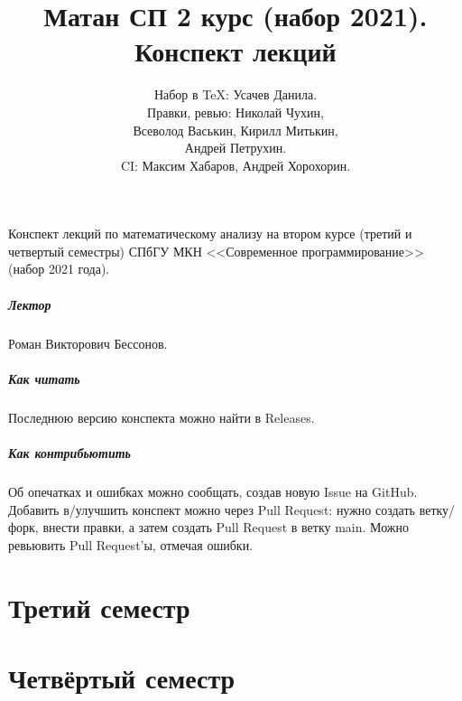\documentclass[a4paper,14pt]{extarticle}
\title{Матан СП 2 курс (набор 2021). \\ Конспект лекций}
\author{Набор в \TeX: Усачев Данила. \\ Правки, ревью: Николай Чухин, \\ Всеволод Васькин, Кирилл Митькин, \\ Андрей Петрухин. \\ CI: Максим Хабаров, Андрей Хорохорин.}
\theoremstyle{definition}
\theoremstyle{plain}
\theoremstyle{plain}
\theoremstyle{plain}
\theoremstyle{plain}
\theoremstyle{definition}
\theoremstyle{definition}
\theoremstyle{definition}
\theoremstyle{definition}
\theoremstyle{definition}
\theoremstyle{definition}
\theoremstyle{definition}
\theoremstyle{definition}
\theoremstyle{definition}
\theoremstyle{plain}
\theoremstyle{plain}
\theoremstyle{plain}
\theoremstyle{plain}
\theoremstyle{definition}
\theoremstyle{definition}
\theoremstyle{definition}
\theoremstyle{definition}
\theoremstyle{definition}
\theoremstyle{definition}
\begin{document}
\maketitle
Конспект лекций по математическому анализу на втором курсе (третий и четвертый семестры) СПбГУ МКН <<Современное программирование>> (набор 2021 года).
\subsubsection*{Лектор}
Роман Викторович Бессонов.
\subsubsection*{Как читать}
Последнюю версию конспекта можно найти в Releases.
\subsubsection*{Как контрибьютить}
Об опечатках и ошибках можно сообщать, создав новую Issue на GitHub.
Добавить в/улучшить конспект можно через Pull Request: нужно создать ветку/форк, внести правки, а затем создать Pull Request в ветку main.
Можно ревьювить Pull Request'ы, отмечая ошибки.
\newpage
\tableofcontents
\newpage

\part{Третий семестр}

















\newpage
\part{Четвёртый семестр}









\end{document}
